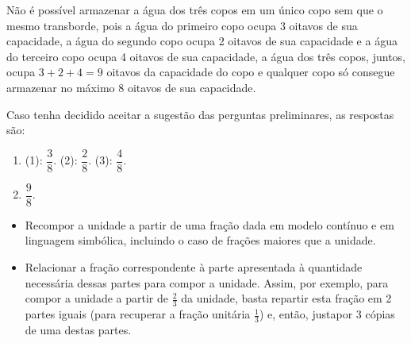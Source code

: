 \begin{multicols}{2}
\begin{orientacoes}

\end{orientacoes}

\begin{solucao}{}{}
  Não é possível armazenar a água dos três copos em um único copo sem que o mesmo transborde, pois a água do primeiro copo ocupa 3 oitavos de sua capacidade, a água do segundo copo ocupa 2 oitavos de sua capacidade e a água do terceiro copo ocupa 4 oitavos de sua capacidade, a água dos três copos, juntos, ocupa       $3 + 2 + 4 = 9$ oitavos da capacidade do copo e qualquer copo só consegue armazenar no máximo $8$ oitavos de sua capacidade.

  Caso tenha decidido aceitar a sugestão das perguntas preliminares, as respostas são:
\begin{enumerate} [\quad a)] %
    \item       (1):       $\dfrac{3}{8}$. (2):       $\dfrac{2}{8}$. (3):       $\dfrac{4}{8}$.
    \item             $\dfrac{9}{8}$.
\end{enumerate} %

\end{solucao}


\begin{objetivos}[label=chap2-ativ11]{}{}
  \begin{itemize} %
    \item       Recompor a unidade a partir de uma fração dada em modelo contínuo e em linguagem simbólica, incluindo o caso de frações maiores que a unidade.
    \item       Relacionar a fração correspondente à parte apresentada à quantidade necessária dessas partes para compor a unidade. Assim, por exemplo, para compor a unidade a partir de       $\frac{2}{3}$ da unidade, basta repartir esta fração em 2 partes iguais (para recuperar a fração unitária       $\frac{1}{3}$) e, então, justapor 3 cópias de uma destas partes.
\end{itemize} %
\end{objetivos}


\end{multicols}
